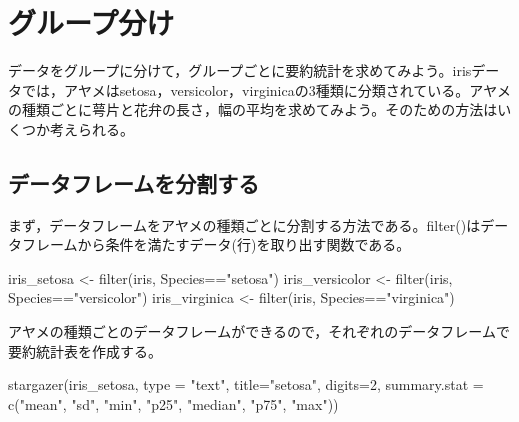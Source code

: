 \documentclass[
]{book}
\newenvironment{Shaded}{\begin{snugshade}}{\end{snugshade}}
\newcommand{\AttributeTok}[1]{\textcolor[rgb]{0.77,0.63,0.00}{#1}}
\newcommand{\DecValTok}[1]{\textcolor[rgb]{0.00,0.00,0.81}{#1}}
\newcommand{\FunctionTok}[1]{\textcolor[rgb]{0.00,0.00,0.00}{#1}}
\newcommand{\NormalTok}[1]{#1}
\newcommand{\OtherTok}[1]{\textcolor[rgb]{0.56,0.35,0.01}{#1}}
\newcommand{\SpecialCharTok}[1]{\textcolor[rgb]{0.00,0.00,0.00}{#1}}
\newcommand{\StringTok}[1]{\textcolor[rgb]{0.31,0.60,0.02}{#1}}
\begin{document}
\hypertarget{ux30b0ux30ebux30fcux30d7ux5206ux3051}{%
\section{グループ分け}\label{ux30b0ux30ebux30fcux30d7ux5206ux3051}}

データをグループに分けて，グループごとに要約統計を求めてみよう。irisデータでは，アヤメはsetosa，versicolor，virginicaの3種類に分類されている。アヤメの種類ごとに萼片と花弁の長さ，幅の平均を求めてみよう。そのための方法はいくつか考えられる。

\hypertarget{ux30c7ux30fcux30bfux30d5ux30ecux30fcux30e0ux3092ux5206ux5272ux3059ux308b}{%
\subsection{データフレームを分割する}\label{ux30c7ux30fcux30bfux30d5ux30ecux30fcux30e0ux3092ux5206ux5272ux3059ux308b}}

まず，データフレームをアヤメの種類ごとに分割する方法である。filter()はデータフレームから条件を満たすデータ(行)を取り出す関数である。

\begin{Shaded}
\begin{Highlighting}[]
\NormalTok{iris\_setosa }\OtherTok{\textless{}{-}} \FunctionTok{filter}\NormalTok{(iris, Species}\SpecialCharTok{==}\StringTok{"setosa"}\NormalTok{)}
\NormalTok{iris\_versicolor }\OtherTok{\textless{}{-}} \FunctionTok{filter}\NormalTok{(iris, Species}\SpecialCharTok{==}\StringTok{"versicolor"}\NormalTok{)}
\NormalTok{iris\_virginica }\OtherTok{\textless{}{-}} \FunctionTok{filter}\NormalTok{(iris, Species}\SpecialCharTok{==}\StringTok{"virginica"}\NormalTok{)}
\end{Highlighting}
\end{Shaded}

アヤメの種類ごとのデータフレームができるので，それぞれのデータフレームで要約統計表を作成する。

\begin{Shaded}
\begin{Highlighting}[]
\FunctionTok{stargazer}\NormalTok{(iris\_setosa, }\AttributeTok{type =} \StringTok{"text"}\NormalTok{, }\AttributeTok{title=}\StringTok{"setosa"}\NormalTok{, }\AttributeTok{digits=}\DecValTok{2}\NormalTok{,}
          \AttributeTok{summary.stat =} \FunctionTok{c}\NormalTok{(}\StringTok{"mean"}\NormalTok{, }\StringTok{"sd"}\NormalTok{, }\StringTok{"min"}\NormalTok{, }\StringTok{"p25"}\NormalTok{, }\StringTok{"median"}\NormalTok{, }\StringTok{"p75"}\NormalTok{, }\StringTok{"max"}\NormalTok{))}
\end{Highlighting}
\end{Shaded}
\end{document}
